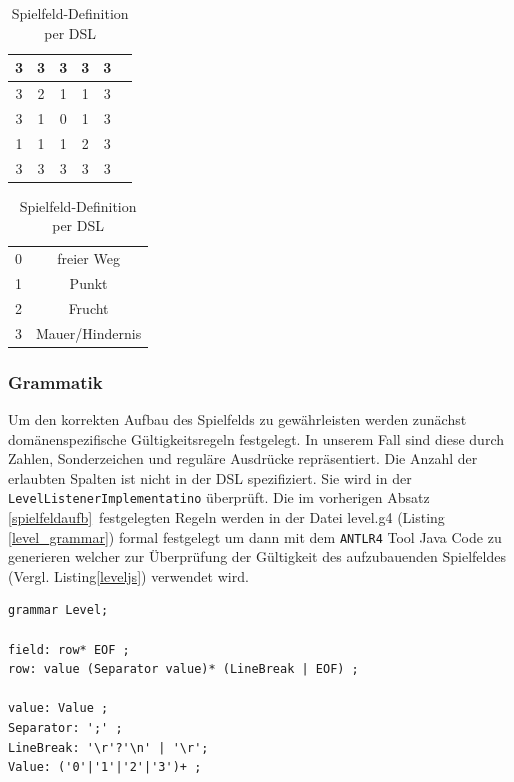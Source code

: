 \documentclass[conference]{IEEEtran}
\begin{document}
\begin{table}[!t]
\caption{Spielfeld-Definition per DSL}
\label{gameboard_dsl}
\centering
\begin{tabular}{|c|c|c|c|c|c|}
\hline
3 & 3 & 3 & 3 & 3\\
\hline
3 & 2 & 1 & 1 & 3\\
\hline
3 & 1 & 0 & 1 & 3\\
\hline
1 & 1 & 1 & 2 & 3\\
\hline
3 & 3 & 3 & 3 & 3\\
\hline
\end{tabular}
\begin{tabular}{|c|c|}
0 & freier Weg\\
1 & Punkt\\
2 & Frucht\\
3 & Mauer/Hindernis
\end{tabular}
\end{table}


\subsubsection{Grammatik}
Um den korrekten Aufbau des Spielfelds zu gewährleisten werden zunächst domänenspezifische Gültigkeitsregeln festgelegt. In unserem Fall sind diese durch Zahlen, Sonderzeichen und reguläre Ausdrücke repräsentiert. Die Anzahl der erlaubten Spalten ist nicht in der DSL spezifiziert. Sie wird in der \texttt{LevelListenerImplementatino} überprüft. Die im vorherigen Absatz \ref{spielfeldaufb} festgelegten Regeln werden in der Datei level.g4 (Listing \ref{level_grammar}) formal festgelegt um dann mit dem \texttt{ANTLR4} Tool Java Code zu generieren welcher zur Überprüfung der Gültigkeit des aufzubauenden Spielfeldes (Vergl. Listing\ref{leveljs}) verwendet wird.

\begin{lstlisting}[captionpos=b, caption={Auszug aus der DSL spezifizierenden Grammatik level.g4}, label=level_grammar]
grammar Level;

field: row* EOF ;
row: value (Separator value)* (LineBreak | EOF) ;

value: Value ;
Separator: ';' ;
LineBreak: '\r'?'\n' | '\r';
Value: ('0'|'1'|'2'|'3')+ ;
\end{lstlisting}
\end{document}

